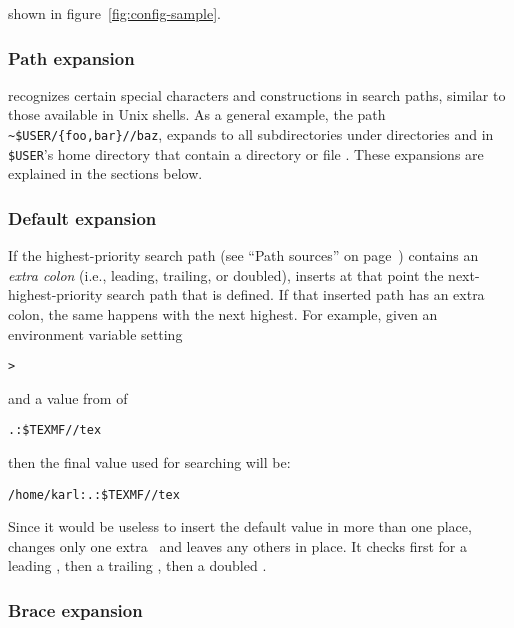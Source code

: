 \documentclass{article}
\begin{document}

\else
shown in figure~\ref{fig:config-sample}.
\fi

\subsubsection{Path expansion}
\label{sec:path-expansion}

\KPS{} recognizes certain special characters and constructions in
search paths, similar to those available in Unix shells.  As a
general example, the path
\verb+~$USER/{foo,bar}//baz+, expands to all subdirectories under
directories  and  in \texttt{\$USER}'s home
directory that contain a directory or file .  These
expansions are explained in the sections below.
\subsubsection{Default expansion}
\label{sec:default-expansion}

If the highest-priority search path (see ``Path sources'' on
page~\pageref{sec:path-sources}) contains an \emph{extra colon} (i.e.,
leading, trailing, or doubled), \KPS{} inserts at that point the
next-highest-prio\-rity search path that is defined.  If that inserted
path has an extra colon, the same happens with the next highest.  For
example, given an environment variable setting

\begin{alltt}
> 
\end{alltt}
and a  value from  of

\begin{alltt}
  .:\$TEXMF//tex
\end{alltt}
then the final value used for searching will be:

\begin{alltt}
  /home/karl:.:\$TEXMF//tex
\end{alltt}

Since it would be useless to insert the default value in more than one
place, \KPS{} changes only one extra \samp{:}\ and leaves any others in
place.  It checks first for a leading \samp{:}, then a trailing
\samp{:}, then a doubled \samp{:}.

\subsubsection{Brace expansion}
\label{sec:brace-expansion}
\end{document}
